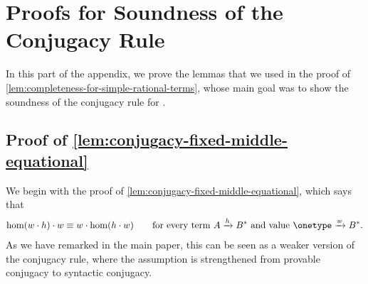 \section{Proofs for Soundness of the Conjugacy Rule}
In this part of the appendix, we prove the lemmas that we used in the proof of \cref{lem:completeness-for-simple-rational-terms}, whose main goal was to show the soundness of the conjugacy rule for . 



\subsection{Proof of \cref{lem:conjugacy-fixed-middle-equational}}\label{sec:proof-of-lem:conjugacy-fixed-middle-equational}
We begin with the proof of \cref{lem:conjugacy-fixed-middle-equational}, which says that 
    \begin{align*}
        \hom(w \wdot h) \wdot w \equiv w \wdot \hom(h \wdot w)
        \qquad \text{for every term $A \xrightarrow h B^*$ and value $\onetype \xrightarrow w B^*$.}
    \end{align*}
As we have remarked in the main paper, this can be seen as  a weaker version of the conjugacy rule, where the assumption is strengthened from provable conjugacy  to syntactic conjugacy. 

